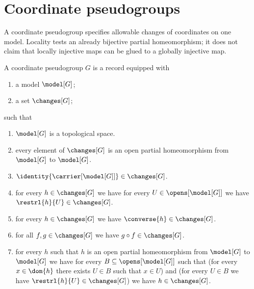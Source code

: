 \section{Coordinate pseudogroups}



A coordinate pseudogroup specifies allowable changes of coordinates on one
model. Locality tests an already bijective partial homeomorphism; it does not
claim that locally injective maps can be glued to a globally injective map.

\begin{struct}\label{coordinate_pseudogroup}
    A coordinate pseudogroup $G$ is a record equipped with
    \begin{enumerate}
        \item a model $\model[G]$;
        \item a set $\changes[G]$;
    \end{enumerate}
    such that
    \begin{enumerate}
        \item\label{pseudogroup_model} $\model[G]$ is a topological space.
        \item\label{pseudogroup_changes}
            every element of $\changes[G]$ is an open partial homeomorphism
                from $\model[G]$ to $\model[G]$.
        \item\label{pseudogroup_identity}
            $\identity{\carrier[\model[G]]}\in\changes[G]$.
        \item\label{pseudogroup_restriction}
            for every $h\in\changes[G]$ we have for every $U\in\opens[\model[G]]$
                we have $\restrl{h}{U}\in\changes[G]$.
        \item\label{pseudogroup_converse}
            for every $h\in\changes[G]$ we have $\converse{h}\in\changes[G]$.
        \item\label{pseudogroup_composition}
            for all $f,g\in\changes[G]$ we have $g\circ f\in\changes[G]$.
        \item\label{pseudogroup_locality}
            for every $h$ such that $h$ is an open partial homeomorphism
                from $\model[G]$ to $\model[G]$ we have
                for every $B\subseteq\opens[\model[G]]$ such that
                    (for every $x\in\dom{h}$ there exists $U\in B$ such that
                        $x\in U$) and
                    (for every $U\in B$ we have $\restrl{h}{U}\in\changes[G]$)
                we have $h\in\changes[G]$.
    \end{enumerate}
\end{struct}

